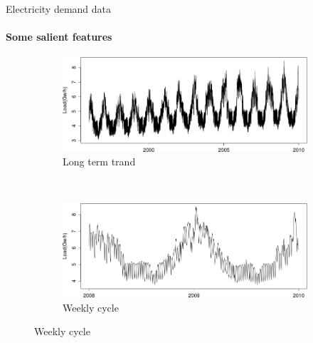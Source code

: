 \documentclass[xcolor=dvipsnames, smaller]{beamer}
\begin{document}
\begin{frame}{Electricity demand data}
\framesubtitle{Some salient features}

\begin{figure}[!ht] \centering
  \begin{subfigure}[t]{0.45\textwidth}
     \includegraphics[width=\textwidth]{pics/longtermload.png}
     \caption{Long term trand} %
  \end{subfigure}%
  ~ %
  \begin{subfigure}[t]{0.45\textwidth}
     \includegraphics[width=\textwidth]{pics/twoyearsload.png}
     \caption{Weekly cycle} %
  \end{subfigure}
  

\end{figure}
\end{frame}
\end{document}

